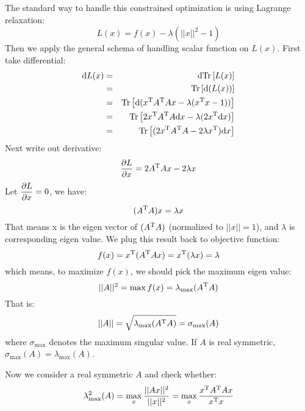 The standard way to handle this constrained optimization is 
using Lagrange relaxation:
\begin{equation}
	L(x) = f(x) - \lambda (||x||^2 - 1)
\end{equation}
Then we apply the general schema of handling scalar function 
on $L(x)$. First take differential:
\begin{eqnarray}
	\mathrm{d}L(x) &=& \mathrm{d}\mathrm{Tr}\left[L(x)\right] \\
	&=& \mathrm{Tr}\left[ \mathrm{d}( L(x) ) \right] \\
	&=& \mathrm{Tr}\left[ \mathrm{d}( x^\mathrm{T}A^\mathrm{T}Ax - \lambda(x^\mathrm{T}x - 1)) \right]  \\
	&=& \mathrm{Tr}\left[ 2 x^\mathrm{T} A^\mathrm{T}A \mathrm{d}x - \lambda (2 x^\mathrm{T} \mathrm{d}x) \right] \\
	&=& \mathrm{Tr}\left[ (2 x^\mathrm{T} A^\mathrm{T}A - 2\lambda x^\mathrm{T}) \mathrm{d}x \right]
\end{eqnarray}
Next write out derivative:
\begin{equation}
	\dfrac{\partial L}{\partial x} = 2 A^\mathrm{T}A x - 2\lambda x
\end{equation}
Let $\dfrac{\partial L}{\partial x} = 0$, we have:
\begin{equation}
	(A^\mathrm{T}A) x = \lambda x
\end{equation}
That means x is the eigen vector of $(A^\mathrm{T}A)$
(normalized to $||x||=1$), and $\lambda$ 
is corresponding eigen value. We plug this result back to objective 
function:
\begin{equation}
	f(x) = x^\mathrm{T}(A^\mathrm{T}Ax) =x^\mathrm{T} (\lambda x) = \lambda
\end{equation}
which means, to maximize $f(x)$, we should pick the maximum 
eigen value:
\begin{equation}
	||A||^2 = \max f(x) = \lambda_{\max}(A^\mathrm{T}A)
\end{equation}
That is:
\begin{equation}
	||A|| = \sqrt{\lambda_{\max}(A^\mathrm{T}A)} = \sigma_{\max}(A)
\end{equation}
where $\sigma_{\max}$ denotes the maximum singular value. 
If $A$ is real symmetric, $\sigma_{\max}(A) = \lambda_{\max}(A) $. 

Now we consider a real symmetric $A$ and check whether:
\begin{equation}
	\lambda^2_{\max}(A) = \max_{x}{\frac{||Ax||^2}{||x||^2}}
	= \max_{x}{\frac{x^\mathrm{T}A^\mathrm{T}Ax}{x^\mathrm{T}x}}
\end{equation}

